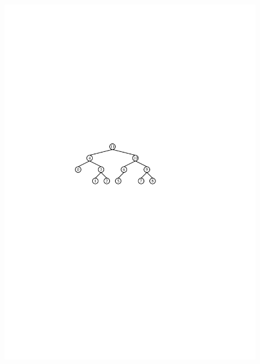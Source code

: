 \begin{figure}
\begin{center}
    \includegraphics[scale=0.90909]{figs/binarytree-numbering-2} \\[2ex]

\end{center}
\end{figure}
